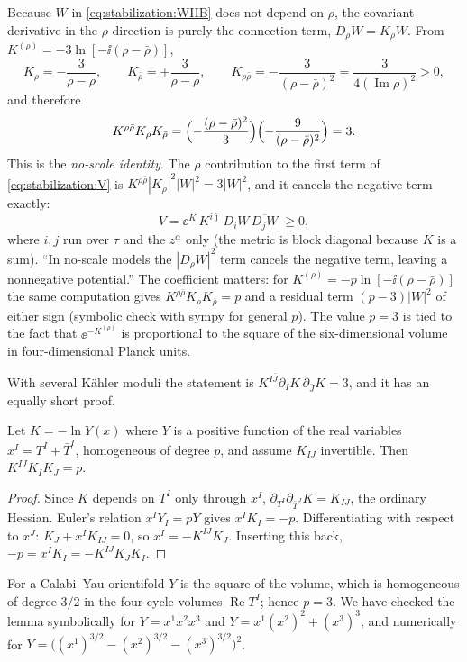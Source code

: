 Because $W$ in \eqref{eq:stabilization:WIIB} does not depend on $\rho$, the covariant
derivative in the $\rho$ direction is purely the connection term, $D_\rho W=K_\rho W$. From
$K^{(\rho)}=-3\ln[-\ii(\rho-\bar\rho)]$,
\begin{equation}\label{eq:stabilization:Krho}
 K_\rho=-\frac{3}{\rho-\bar\rho},\qquad K_{\bar\rho}=+\frac{3}{\rho-\bar\rho},\qquad
 K_{\rho\bar\rho}=-\frac{3}{(\rho-\bar\rho)^2}=\frac{3}{4(\operatorname{Im}\rho)^2}>0 ,
\end{equation}
and therefore
\begin{equation}\label{eq:stabilization:noscale}
 K^{\rho\bar\rho}K_\rho K_{\bar\rho}
 =\Bigl(-\frac{(\rho-\bar\rho)^2}{3}\Bigr)\Bigl(-\frac{9}{(\rho-\bar\rho)^2}\Bigr)=3 .
\end{equation}
This is the \emph{no-scale identity}. The $\rho$ contribution to the
first term of \eqref{eq:stabilization:V} is $K^{\rho\bar\rho}|K_\rho|^2|W|^2=3|W|^2$, and it
cancels the negative term exactly:
\begin{equation}\label{eq:stabilization:Vns}
 V=\ee^{K}\,K^{i\bar\jmath}\,D_iW\,\overline{D_jW}\;\ge0 ,
\end{equation}
where $i,j$ run over $\tau$ and the $z^\alpha$ only (the metric is block diagonal because $K$ is
a sum). ``In no-scale models the $|D_\rho W|^2$ term cancels the negative term, leaving a
nonnegative potential.''  \TL{} The coefficient matters: for
$K^{(\rho)}=-p\ln[-\ii(\rho-\bar\rho)]$ the same computation gives
$K^{\rho\bar\rho}K_\rho K_{\bar\rho}=p$ and a residual term $(p-3)|W|^2$ of either sign
(symbolic check with sympy for general $p$). The value $p=3$ is tied to the fact that
$\ee^{-K^{(\rho)}}$ is proportional to the square of the six-dimensional volume in
four-dimensional Planck units.

With several K\"ahler moduli the statement is $K^{I\bar J}\partial_IK\,\partial_{\bar J}K=3$,
 and it has an equally short proof.

\begin{lemma}\label{lem:stabilization:hom}
Let $K=-\ln Y(x)$ where $Y$ is a positive function of the real variables
$x^I=T^I+\bar T^I$, homogeneous of degree $p$, and assume $K_{IJ}$ invertible. Then
$K^{IJ}K_IK_J=p$.
\end{lemma}
\begin{proof}
Since $K$ depends on $T^I$ only through $x^I$, $\partial_{T^I}\partial_{\bar T^J}K=K_{IJ}$, the
ordinary Hessian. Euler's relation $x^IY_I=pY$ gives $x^IK_I=-p$. Differentiating with respect
to $x^J$: $K_J+x^IK_{IJ}=0$, so $x^I=-K^{IJ}K_J$. Inserting this back,
$-p=x^IK_I=-K^{IJ}K_JK_I$.
\end{proof}
For a Calabi--Yau orientifold $Y$ is the square of the volume, which is homogeneous of degree
$3/2$ in the four-cycle volumes $\operatorname{Re}T^I$; hence $p=3$. We have checked the lemma
symbolically for $Y=x^1x^2x^3$ and $Y=x^1(x^2)^2+(x^3)^3$, and numerically for
$Y=\bigl((x^1)^{3/2}-(x^2)^{3/2}-(x^3)^{3/2}\bigr)^2$.

